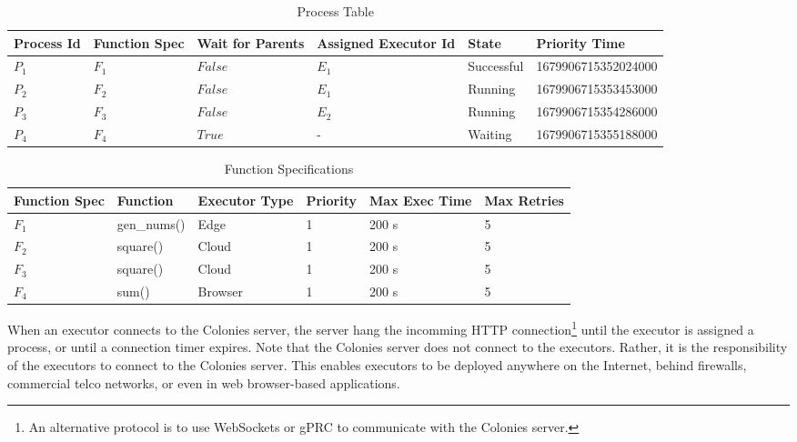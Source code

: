 \documentclass{article}
\begin{document}
\begin{table}[t]
	\caption{Process Table}
	\centering
	\begin{tabular}{llllll}
		\toprule
		\cmidrule(r){1-2}
        Process Id & Function Spec & Wait for Parents & Assigned Executor Id & State      & Priority Time \\
		\midrule
        $P_{1}$    & $F_{1}$       & $False$          & $E_{1}$              & Successful & 1679906715352024000 \\
        $P_{2}$    & $F_{2}$       & $False$          & $E_{1}$              & Running    & 1679906715353453000 \\
        $P_{3}$    & $F_{3}$       & $False$          & $E_{2}$              & Running    & 1679906715354286000 \\
        $P_{4}$    & $F_{4}$       & $True$           & -                    & Waiting    & 1679906715355188000 \\
		\bottomrule
	\end{tabular}
	\label{proctable}
\end{table}

\begin{table}[t]
	\caption{Function Specifications}
	\centering
	\begin{tabular}{llllll}
		\toprule
		\cmidrule(r){1-2}
        Function Spec & Function        & Executor Type & Priority & Max Exec Time & Max Retries \\
		\midrule
        $F_{1}$       & gen\_nums()     & Edge          & 1        & 200 s         & 5 \\
        $F_{2}$       & square()        & Cloud         & 1        & 200 s         & 5 \\
        $F_{3}$       & square()        & Cloud         & 1        & 200 s         & 5 \\
        $F_{4}$       & sum()           & Browser       & 1        & 200 s         & 5 \\
		\bottomrule
	\end{tabular}
	\label{functable}
\end{table}

When an executor connects to the Colonies server, the server hang the incomming HTTP connection\footnote{An alternative protocol is to use WebSockets or gPRC to communicate with the Colonies server.} until the executor is assigned a process, or until a connection timer expires. Note that the Colonies server does not connect to the executors. Rather, it is the responsibility of the executors to connect to the Colonies server. This enables executors to be deployed anywhere on the Internet, behind firewalls, commercial telco networks, or even in web browser-based applications.
\end{document}
